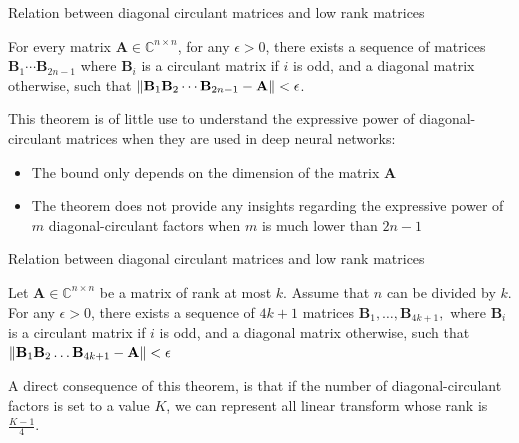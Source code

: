 \documentclass[9pt]{beamer}
\begin{document}
\begin{frame}{Relation between diagonal circulant matrices and low rank matrices}

\begin{theorem} 
For every matrix $\mathbf{A} \in \mathbb{C}^{n \times n}$, for any $\epsilon > 0$, there exists a sequence of matrices $\mathbf{B}_1 \cdots \mathbf{B}_{2n-1}$ where $\mathbf{B}_i$ is a circulant matrix if $i$ is odd, and a diagonal matrix otherwise, such that $\norm{\mathbf{B}_1 \mathbf{B}_2 \cdots \mathbf{B}_{2n-1} - \mathbf{A}} < \epsilon$.
\end{theorem}

\vspace{0.5cm}

This theorem is of little use to understand the expressive power of diagonal-circulant matrices when they are used in deep neural networks:
\begin{itemize}
    \item The bound only depends on the dimension of the matrix $\mathbf{A}$
    \item The theorem does not provide any insights regarding the expressive power of $m$ diagonal-circulant factors when $m$ is much lower than $2n - 1$
\end{itemize}
\end{frame}

\begin{frame}{Relation between diagonal circulant matrices and low rank matrices}
    
\begin{theorem} Let $\mathbf{A} \in \mathbb{C}^{n \times n}$ be
a matrix of rank at most $k$. Assume that $n$ can be divided by $k$. For
any $\epsilon > 0$, there exists a sequence of $4k+1$ matrices $\mathbf{B}_{1}, \dots, \mathbf{B}_{4k+1},$ where $\mathbf{B}_{i}$ is a circulant matrix if $i$ is odd, and a diagonal matrix otherwise, such that $\norm{\mathbf{B}_1\mathbf{B}_2 \dots \mathbf{B}_{4k+1} - \mathbf{A}} < \epsilon$
\end{theorem}

\vspace{0.5cm}

A direct consequence of this theorem, is that if the number of diagonal-circulant factors is set to a value $K$, we can represent all linear transform whose rank is $\frac{K - 1}{4}$.
\end{frame}
\end{document}
